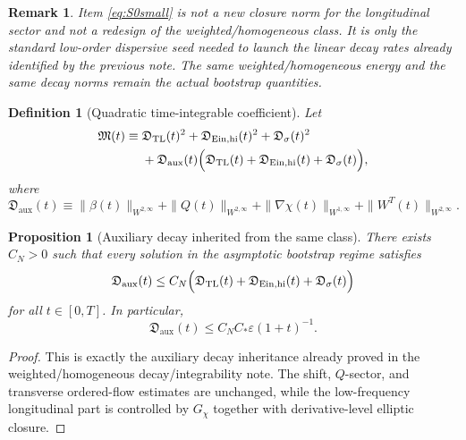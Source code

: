 \documentclass[11pt]{article}
\newtheorem{definition}{Definition}
\newtheorem{proposition}{Proposition}
\newtheorem{remark}{Remark}
\begin{document}
\begin{remark}
Item \eqref{eq:S0small} is not a new closure norm for the longitudinal sector and not a redesign of the weighted/homogeneous class. It is only the standard low-order dispersive seed needed to launch the linear decay rates already identified by the previous note. The same weighted/homogeneous energy and the same decay norms remain the actual bootstrap quantities.
\end{remark}

\begin{definition}[Quadratic time-integrable coefficient]
\label{def:M}
Let
\begin{align}
\mathfrak M(t)
\equiv\;&
\mathfrak D_{\mathrm{TL}}(t)^2
+ \mathfrak D_{\mathrm{Ein,hi}}(t)^2
+ \mathfrak D_\sigma(t)^2
\nonumber\\
&+
\mathfrak D_{\mathrm{aux}}(t)\Bigl(
\mathfrak D_{\mathrm{TL}}(t)
+ \mathfrak D_{\mathrm{Ein,hi}}(t)
+ \mathfrak D_\sigma(t)
\Bigr),
\label{eq:Mdef}
\end{align}
where
\begin{equation}
\mathfrak D_{\mathrm{aux}}(t)
\equiv
\|\beta(t)\|_{W^{2,\infty}}
+ \|Q(t)\|_{W^{2,\infty}}
+ \|\nabla\chi(t)\|_{W^{1,\infty}}
+ \|W^T(t)\|_{W^{2,\infty}}.
\label{eq:Daux}
\end{equation}
\end{definition}

\begin{proposition}[Auxiliary decay inherited from the same class]
\label{prop:auxdecay}
There exists \(C_N>0\) such that every solution in the asymptotic bootstrap regime satisfies
\begin{equation}
\mathfrak D_{\mathrm{aux}}(t)
\le
C_N\Bigl(
\mathfrak D_{\mathrm{TL}}(t)
+ \mathfrak D_{\mathrm{Ein,hi}}(t)
+ \mathfrak D_\sigma(t)
\Bigr)
\label{eq:auxdecay}
\end{equation}
for all \(t\in[0,T]\). In particular,
\begin{equation}
\mathfrak D_{\mathrm{aux}}(t)\le C_NC_\ast\varepsilon(1+t)^{-1}.
\label{eq:auxdecay2}
\end{equation}
\end{proposition}

\begin{proof}
This is exactly the auxiliary decay inheritance already proved in the weighted/homogeneous decay/integrability note. The shift, \(Q\)-sector, and transverse ordered-flow estimates are unchanged, while the low-frequency longitudinal part is controlled by \(G_\chi\) together with derivative-level elliptic closure.
\end{proof}
\end{document}
